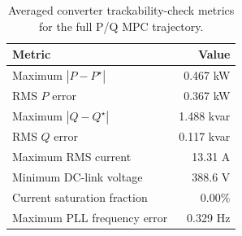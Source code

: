 \begin{table}[!t]
\centering
\caption{Averaged converter trackability-check metrics for the full P/Q MPC trajectory.}
\label{tab:converter_validation}
\begin{tabular}{lr}
\toprule
Metric & Value \\
\midrule
Maximum $|P-P^\star|$ & 0.467 kW \\
RMS $P$ error & 0.367 kW \\
Maximum $|Q-Q^\star|$ & 1.488 kvar \\
RMS $Q$ error & 0.117 kvar \\
Maximum RMS current & 13.31 A \\
Minimum DC-link voltage & 388.6 V \\
Current saturation fraction & 0.00\% \\
Maximum PLL frequency error & 0.329 Hz \\
\bottomrule
\end{tabular}
\end{table}
